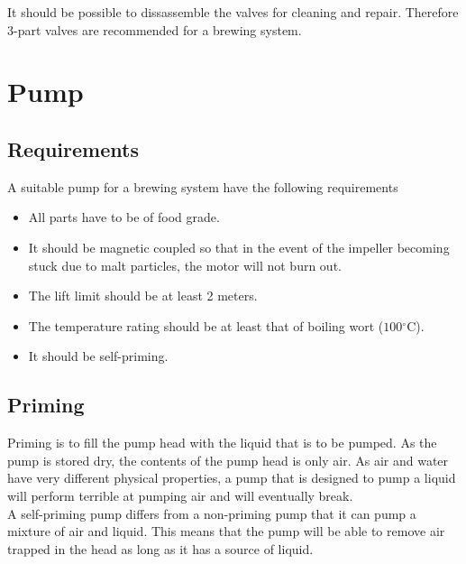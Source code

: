 \documentclass[11pt,fleqn]{book} %
\newcommand{\degree}{\ensuremath{^\circ}}
\begin{document}
It should be possible to dissassemble the valves for cleaning and repair. Therefore 3-part valves are recommended for a brewing system.



\chapter{Pump}

\section{Requirements}

A suitable pump for a brewing system have the following requirements

\begin{itemize}
\item All parts have to be of food grade.
\item It should be magnetic coupled so that in the event of the impeller becoming stuck due to malt particles, the motor will not burn out.
\item The lift limit should be at least 2 meters.
\item The temperature rating should be at least that of boiling wort ($100\degree$C).
\item It should be self-priming.
\end{itemize}

\section{Priming}

Priming is to fill the pump head with the liquid that is to be pumped. As the pump is stored dry, the contents of the pump head is only air. As air and water have very different physical properties, a pump that is designed to pump a liquid will perform terrible at pumping air and will eventually break.\\

A self-priming pump differs from a non-priming pump that it can pump a mixture of air and liquid. This means that the pump will be able to remove air trapped in the head as long as it has a source of liquid.\\
\end{document}

